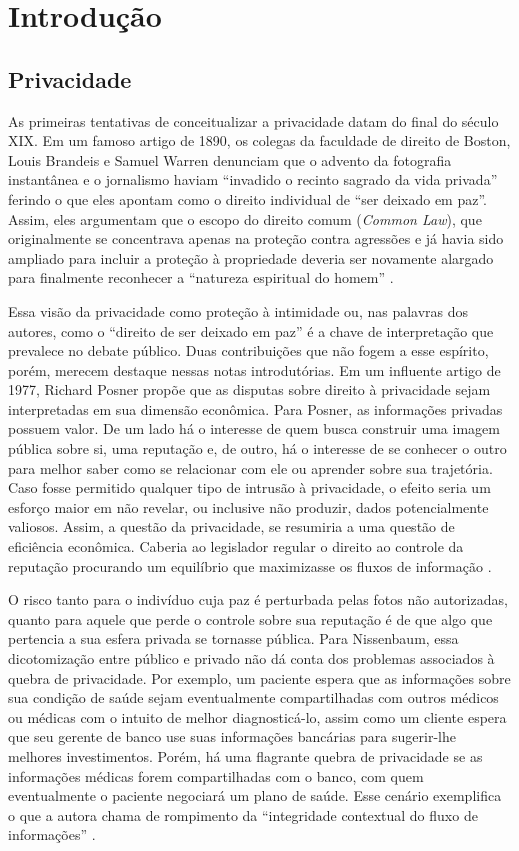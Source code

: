 \chapter{Introdução}

\section{Privacidade}
\label{sec:privacidade}

As primeiras tentativas de conceitualizar a privacidade datam do final do século XIX.
Em um famoso artigo de 1890, os colegas da faculdade de direito de Boston, Louis Brandeis e Samuel Warren denunciam que o advento da fotografia instantânea e o jornalismo haviam ``invadido o recinto sagrado da vida privada'' ferindo o que eles apontam como o direito individual de ``ser deixado em paz''.
Assim, eles argumentam que o escopo do direito comum ({\em Common Law}), que originalmente se concentrava apenas na proteção contra agressões e já havia sido ampliado para incluir a proteção à propriedade deveria ser novamente alargado para finalmente reconhecer a ``natureza espiritual do homem'' \cite{Warren1890}.

Essa visão da privacidade como proteção à intimidade ou, nas palavras dos autores, como o ``direito de ser deixado em paz'' é a chave de interpretação que prevalece no debate público.
Duas contribuições que não fogem a esse espírito, porém, merecem destaque nessas notas introdutórias.
Em um influente artigo de 1977, Richard Posner propõe que as disputas sobre direito à privacidade sejam interpretadas em sua dimensão econômica.
Para Posner, as informações privadas possuem valor. 
De um lado há o interesse de quem busca construir uma imagem pública sobre si, uma reputação e, de outro, há o interesse de se conhecer o outro para melhor saber como se relacionar com ele ou aprender sobre sua trajetória.
Caso fosse permitido qualquer tipo de intrusão à privacidade, o efeito seria um esforço maior em não revelar, ou inclusive não produzir, dados potencialmente valiosos.
Assim, a questão da privacidade, se resumiria a uma questão de eficiência econômica.
Caberia ao legislador regular o direito ao controle da reputação procurando um equilíbrio que maximizasse os fluxos de informação \cite{Posner77}. 

O risco tanto para o indivíduo cuja paz é  perturbada pelas fotos não autorizadas, quanto para aquele que perde o controle sobre sua reputação é de que algo que pertencia a sua esfera privada se tornasse pública.
Para Nissenbaum, essa dicotomização entre público e privado não dá conta dos problemas associados à quebra de privacidade.
Por exemplo, um paciente espera que as informações sobre sua condição de saúde sejam eventualmente compartilhadas com outros médicos ou médicas com o intuito de melhor diagnosticá-lo, assim como um cliente espera que seu gerente de banco use suas informações bancárias para sugerir-lhe melhores investimentos.
Porém, há uma flagrante quebra de privacidade se as informações médicas forem compartilhadas com o banco, com quem eventualmente o paciente negociará um plano de saúde.
Esse cenário exemplifica o que a autora chama de rompimento da ``integridade contextual do fluxo de informações'' \cite{Nissenbaum09}.

